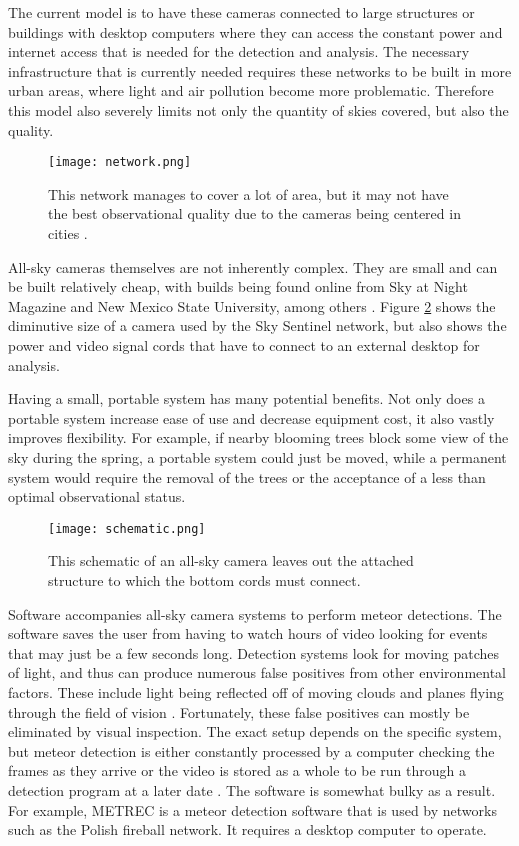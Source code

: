 The current model is to have these cameras connected to large structures or buildings with desktop computers where they can access the constant power and internet access that is needed for the detection and analysis. The necessary infrastructure that is currently needed requires these networks to be built in more urban areas, where light and air pollution become more problematic. Therefore this  model also severely limits not only the quantity of skies covered, but also the quality.

\begin{figure}[ht!]
	\centering
	\texttt{[image: network.png]}
	\caption{This network manages to cover a lot of area, but it may not have the best observational quality due to the cameras being centered in cities \protect\cite{SkySentinel}.}
	\label{fig:network}
\end{figure}

All-sky cameras themselves are not inherently complex. They are small and can be built relatively cheap, with builds being found online from Sky at Night Magazine and New Mexico State University, among others \cite{Bannister2012}. Figure \ref{fig:schematic} shows the diminutive size of a camera used by the Sky Sentinel network, but also shows the power and video signal cords that have to connect to an external desktop for analysis. 

Having a small, portable system has many potential benefits. Not only does a portable system increase ease of use and decrease equipment cost, it also vastly improves flexibility. For example, if nearby blooming trees block some view of the sky during the spring, a portable system could just be moved, while a permanent system would require the removal of the trees or the acceptance of a less than optimal observational status.

\begin{figure}[ht!]
	\centering
	\texttt{[image: schematic.png]}
	\caption{This schematic of an all-sky camera leaves out the attached structure to which the bottom cords must connect\protect\cite{Bannister2012}.}
	\label{fig:schematic}
\end{figure}

Software accompanies all-sky camera systems to perform meteor detections. The software saves the user from having to watch hours of video looking for events that may just be a few seconds long. Detection systems look for moving patches of light, and thus can produce numerous false positives from other environmental factors. These include light being reflected off of moving clouds and planes flying through the field of vision \cite{Harbaugh2008}. Fortunately, these false positives can mostly be eliminated by visual inspection. The exact setup depends on the specific system, but meteor detection is either constantly processed by a computer checking the frames as they arrive or the video is stored as a whole to be run through a detection program at a later date \cite{Molau2005}. The software is somewhat bulky as a result. For example, METREC is a meteor detection software that is used by networks such as the Polish fireball network. It requires a desktop computer to operate\cite{Molau2005}.

